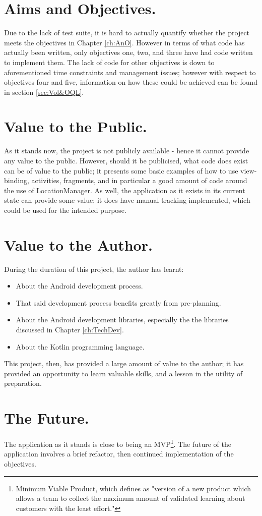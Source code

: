 \documentclass[11pt, a4paper, notitlepage]{report}
\begin{document}
\section{Aims and Objectives.}
Due to the lack of test suite, it is hard to actually quantify whether the project meets the objectives in Chapter \ref{ch:AnO}. However in terms of what code has actually been written, only objectives one, two, and three have had code written to implement them. The lack of code for other objectives is down to aforementioned time constraints and management issues; however with respect to objectives four and five, information on how these could be achieved can be found in section \ref{sec:Vol&OQL}.

\section{Value to the Public.}
As it stands now, the project is not publicly available - hence it cannot provide any value to the public. However, should it be publicised, what code does exist can be of value to the public; it presents some basic examples of how to use view-binding, activities, fragments, and in particular a good amount of code around the use of LocationManager. As well, the application as it exists in its current state can provide some value; it does have manual tracking implemented, which could be used for the intended purpose.

\section{Value to the Author.}
During the duration of this project, the author has learnt:
\begin{itemize}
	\item About the Android development process.
	\item That said development process benefits greatly from pre-planning.
	\item About the Android development libraries, especially the the libraries discussed in Chapter \ref{ch:TechDev}.
	\item About the Kotlin programming language.
\end{itemize}
This project, then, has provided a large amount of value to the author; it has provided an opportunity to learn valuable skills, and a lesson in the utility of preparation.

\section{The Future.}
The application as it stands is close to being an MVP\footnote{Minimum Viable Product, which \citet{mvpAGuide} defines as "version of a new product which allows a team to collect the maximum amount of validated learning about customers with the least effort."}. The future of the application involves a brief refactor, then continued implementation of the objectives.
\end{document}
